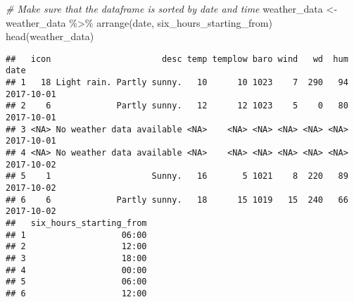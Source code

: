 \documentclass[
]{article}
\newenvironment{Shaded}{\begin{snugshade}}{\end{snugshade}}
\newcommand{\CommentTok}[1]{\textcolor[rgb]{0.56,0.35,0.01}{\textit{#1}}}
\newcommand{\FunctionTok}[1]{\textcolor[rgb]{0.00,0.00,0.00}{#1}}
\newcommand{\NormalTok}[1]{#1}
\newcommand{\OtherTok}[1]{\textcolor[rgb]{0.56,0.35,0.01}{#1}}
\newcommand{\SpecialCharTok}[1]{\textcolor[rgb]{0.00,0.00,0.00}{#1}}
\begin{document}
\begin{Shaded}
\begin{Highlighting}[]
\CommentTok{\# Make sure that the dataframe is sorted by date and time}
\NormalTok{weather\_data }\OtherTok{\textless{}{-}}\NormalTok{ weather\_data }\SpecialCharTok{\%\textgreater{}\%}
  \FunctionTok{arrange}\NormalTok{(date, six\_hours\_starting\_from)}
\FunctionTok{head}\NormalTok{(weather\_data)}
\end{Highlighting}
\end{Shaded}

\begin{verbatim}
##   icon                      desc temp templow baro wind   wd  hum       date
## 1   18 Light rain. Partly sunny.   10      10 1023    7  290   94 2017-10-01
## 2    6             Partly sunny.   12      12 1023    5    0   80 2017-10-01
## 3 <NA> No weather data available <NA>    <NA> <NA> <NA> <NA> <NA> 2017-10-01
## 4 <NA> No weather data available <NA>    <NA> <NA> <NA> <NA> <NA> 2017-10-02
## 5    1                    Sunny.   16       5 1021    8  220   89 2017-10-02
## 6    6             Partly sunny.   18      15 1019   15  240   66 2017-10-02
##   six_hours_starting_from
## 1                   06:00
## 2                   12:00
## 3                   18:00
## 4                   00:00
## 5                   06:00
## 6                   12:00
\end{verbatim}
\end{document}
